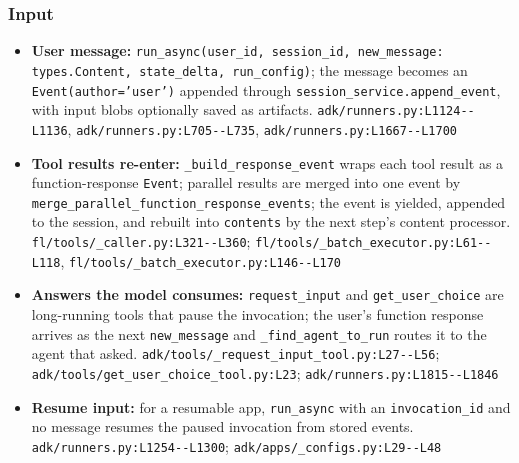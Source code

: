 \subsubsection*{Input}
\begin{itemize}
\item \textbf{User message:} \texttt{run\_\allowbreak{}async(\allowbreak{}user\_\allowbreak{}id, session\_\allowbreak{}id, new\_\allowbreak{}message:\allowbreak{} types.\allowbreak{}Content, state\_\allowbreak{}delta, run\_\allowbreak{}config)}; the message becomes an \texttt{Event(\allowbreak{}author='user')} appended through \texttt{session\_\allowbreak{}service.\allowbreak{}append\_\allowbreak{}event}, with input blobs optionally saved as artifacts. \texttt{adk/\allowbreak{}runners.\allowbreak{}py:\allowbreak{}L1124-\allowbreak{}-\allowbreak{}L1136}, \texttt{adk/\allowbreak{}runners.\allowbreak{}py:\allowbreak{}L705-\allowbreak{}-\allowbreak{}L735}, \texttt{adk/\allowbreak{}runners.\allowbreak{}py:\allowbreak{}L1667-\allowbreak{}-\allowbreak{}L1700}
\item \textbf{Tool results re-enter:} \texttt{\_\allowbreak{}build\_\allowbreak{}response\_\allowbreak{}event} wraps each tool result as a function-response \texttt{Event}; parallel results are merged into one event by \texttt{merge\_\allowbreak{}parallel\_\allowbreak{}function\_\allowbreak{}response\_\allowbreak{}events}; the event is yielded, appended to the session, and rebuilt into \texttt{contents} by the next step's content processor. \texttt{fl/\allowbreak{}tools/\allowbreak{}\_\allowbreak{}caller.\allowbreak{}py:\allowbreak{}L321-\allowbreak{}-\allowbreak{}L360}; \texttt{fl/\allowbreak{}tools/\allowbreak{}\_\allowbreak{}batch\_\allowbreak{}executor.\allowbreak{}py:\allowbreak{}L61-\allowbreak{}-\allowbreak{}L118}, \texttt{fl/\allowbreak{}tools/\allowbreak{}\_\allowbreak{}batch\_\allowbreak{}executor.\allowbreak{}py:\allowbreak{}L146-\allowbreak{}-\allowbreak{}L170}
\item \textbf{Answers the model consumes:} \texttt{request\_\allowbreak{}input} and \texttt{get\_\allowbreak{}user\_\allowbreak{}choice} are long-running tools that pause the invocation; the user's function response arrives as the next \texttt{new\_\allowbreak{}message} and \texttt{\_\allowbreak{}find\_\allowbreak{}agent\_\allowbreak{}to\_\allowbreak{}run} routes it to the agent that asked. \texttt{adk/\allowbreak{}tools/\allowbreak{}\_\allowbreak{}request\_\allowbreak{}input\_\allowbreak{}tool.\allowbreak{}py:\allowbreak{}L27-\allowbreak{}-\allowbreak{}L56}; \texttt{adk/\allowbreak{}tools/\allowbreak{}get\_\allowbreak{}user\_\allowbreak{}choice\_\allowbreak{}tool.\allowbreak{}py:\allowbreak{}L23}; \texttt{adk/\allowbreak{}runners.\allowbreak{}py:\allowbreak{}L1815-\allowbreak{}-\allowbreak{}L1846}
\item \textbf{Resume input:} for a resumable app, \texttt{run\_\allowbreak{}async} with an \texttt{invocation\_\allowbreak{}id} and no message resumes the paused invocation from stored events. \texttt{adk/\allowbreak{}runners.\allowbreak{}py:\allowbreak{}L1254-\allowbreak{}-\allowbreak{}L1300}; \texttt{adk/\allowbreak{}apps/\allowbreak{}\_\allowbreak{}configs.\allowbreak{}py:\allowbreak{}L29-\allowbreak{}-\allowbreak{}L48}
\end{itemize}

